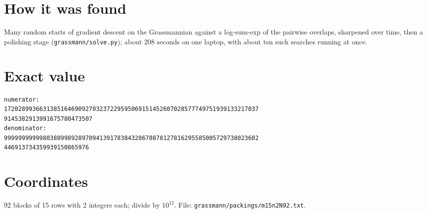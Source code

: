 \documentclass[11pt,a4paper]{article}
\begin{document}
\section{How it was found}
Many random starts of gradient descent on the Grassmannian against a log-sum-exp of the pairwise overlaps, sharpened over time, then a polishing stage (\texttt{grassmann/solve.py}); about 208 seconds on one laptop, with about ten such searches running at once.


\appendix
\section{Exact value}
{\small
\begin{verbatim}
numerator:
172028993663138516469092703237229595069151452607028577749751939133217037
9145382913991675780473507
denominator:
999999999998038899892897094139178384328670878127816295585005729738023602
446913734359939150865976
\end{verbatim}}

\section{Coordinates}
92 blocks of 15 rows with 2 integers each; divide by $10^{12}$. File: \texttt{grassmann/packings/m15n2N92.txt}.
{\tiny
\begin{multicols}{4}
\end{multicols}}
\end{document}
